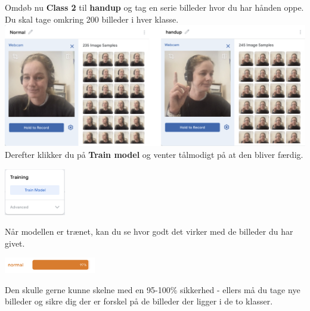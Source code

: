 \documentclass{ucph-handout}
\begin{document}
\begin{exercisebox}[adjusted title= Teachable Machine]
Omdøb nu \textbf{Class 2} til \textbf{handup} og tag en serie billeder hvor du har hånden oppe. Du skal tage omkring 200 billeder i hver klasse. \\

\includegraphics[width=1\textwidth]{billeder/training.png}\\

Derefter klikker du på \textbf{Train model} og venter tålmodigt på at den bliver færdig.

\begin{center}
\includegraphics[width=0.2\textwidth]{billeder/trainmodel.png}
\end{center}

Når modellen er trænet, kan du se hvor godt det virker med de billeder du har givet. 

\includegraphics[width=0.30\textwidth]{ikoner/prcent.png}

Den skulle gerne kunne skelne med en 95-100\% sikkerhed - ellers må du tage nye billeder og sikre dig der er forskel på de billeder der ligger i de to klasser. 

\end{exercisebox}
\end{document}
